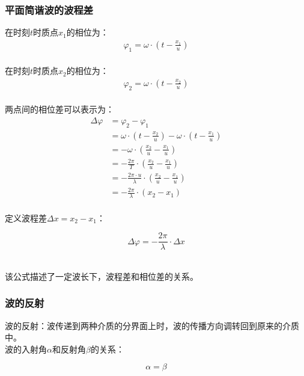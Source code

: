 \documentclass[UTF8]{ctexart}
\begin{document}
\subsubsection{平面简谐波的波程差}
    在时刻$t$时质点$x_1$的相位为：
    \setcounter{equation}{0}
    \begin{align}
        \varphi_1=\omega\cdot\left(t-\frac{x_1}{u}\right)
    \end{align}\\
    在时刻$t$时质点$x_2$的相位为：
    \begin{align}
        \varphi_2=\omega\cdot\left(t-\frac{x_2}{u}\right)
    \end{align}\\
    两点间的相位差可以表示为：
    \begin{align}
        \Delta\varphi
        &=\varphi_2-\varphi_1\\[5mm]
        &=\omega\cdot\left(t-\frac{x_2}{u}\right)-\omega\cdot\left(t-\frac{x_1}{u}\right)\\[5mm]
        &=-\omega\cdot\left(\frac{x_2}{u}-\frac{x_1}{u}\right)\\[5mm]
        &=-\frac{2\pi}{T}\cdot\left(\frac{x_2}{u}-\frac{x_1}{u}\right)\\[5mm]
        &=-\frac{2\pi\cdot u}{\lambda}\cdot\left(\frac{x_2}{u}-\frac{x_1}{u}\right)\\[5mm]
        &=-\frac{2\pi}{\lambda}\cdot\left(x_2-x_1\right)
    \end{align}\\
    定义波程差$\Delta x=x_2-x_1$：
    \begin{large}
        \begin{equation*}
            \Delta\varphi=-\frac{2\pi}{\lambda}\cdot\Delta x
        \end{equation*}
    \end{large}\\
    该公式描述了一定波长下，波程差和相位差的关系。
    

\newpage

\subsubsection{波的反射}
    波的反射：波传递到两种介质的分界面上时，波的传播方向调转回到原来的介质中。\\[3mm]
    波的入射角$\alpha$和反射角$\beta$的关系：
    \begin{large}
        \begin{equation*}
            \alpha=\beta
        \end{equation*}
    \end{large}
\end{document}
